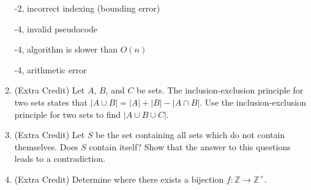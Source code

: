 \begin{enumerate}
\begin{rubric}
-2, incorrect indexing (bounding error)

-4, invalid pseudocode

-4, algorithm is slower than $O(n)$

-4, arithmetic error
\end{rubric}

\item (Extra Credit) Let $A$, $B$, and $C$ be sets. The inclusion-exclusion principle for two sets states that $|A \cup B| = |A| + |B| - |A \cap B|$. Use the inclusion-exclusion principle for two sets to find $|A \cup B \cup C|.$ 

\item (Extra Credit) Let $S$ be the set containing all sets which do not contain themselves. Does $S$ contain itself? Show that the answer to this questions leads to a contradiction. 

\item (Extra Credit) Determine where there exists a bijection $f : \mathbb{Z} \rightarrow \mathbb{Z}^+$. 

\end{enumerate}